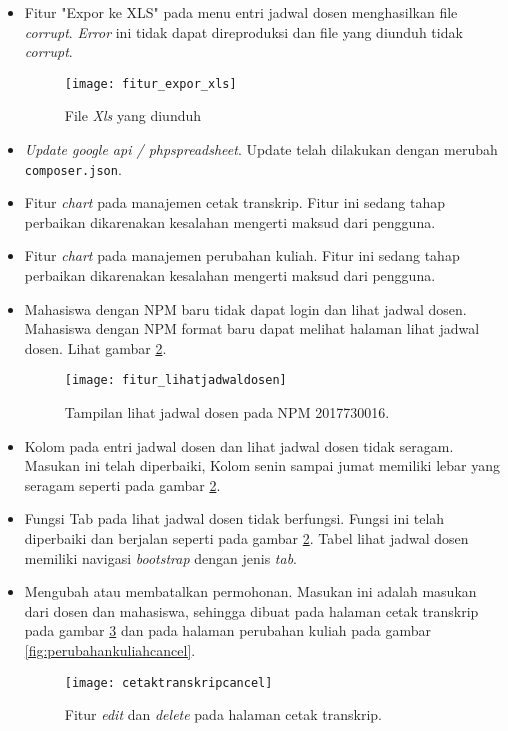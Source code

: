 \documentclass[a4paper,twoside]{article}
\begin{document}
\begin{enumerate}
	\begin{itemize}
		\item Fitur "Expor ke XLS" pada menu  entri jadwal dosen  menghasilkan file \textit{corrupt}. \textit{Error} ini tidak dapat direproduksi dan file yang diunduh tidak \textit{corrupt}.		
		\begin{figure}[H]
			\centering
			\texttt{[image: fitur\_expor\_xls]} 
			\caption{File \textit{Xls} yang diunduh}
			\label{fig:expor_ke_xls} 
		\end{figure}
		
		\item \textit{Update google api / phpspreadsheet}. Update telah dilakukan dengan merubah \texttt{composer.json}.
				
		\item  Fitur \textit{chart} pada manajemen cetak transkrip. Fitur ini sedang tahap perbaikan dikarenakan kesalahan mengerti maksud dari pengguna.		
		
		\item Fitur \textit{chart} pada manajemen perubahan kuliah. Fitur ini sedang tahap perbaikan dikarenakan kesalahan mengerti maksud dari pengguna.	
		
		\item Mahasiswa dengan NPM baru tidak dapat login dan lihat jadwal dosen. Mahasiswa dengan NPM format baru dapat melihat halaman lihat jadwal dosen. Lihat gambar \ref{fig:lihatjadwaldosen}.		
		\begin{figure}[H]
			\centering
			\texttt{[image: fitur\_lihatjadwaldosen]} 
			\caption{Tampilan lihat jadwal dosen pada NPM 2017730016.}
			\label{fig:lihatjadwaldosen} 
		\end{figure}
				
		\item Kolom pada entri jadwal dosen dan lihat jadwal dosen tidak seragam. Masukan ini telah diperbaiki, Kolom senin sampai jumat memiliki lebar yang seragam seperti pada gambar \ref{fig:lihatjadwaldosen}.		
		\item Fungsi Tab pada lihat jadwal dosen tidak berfungsi. Fungsi ini telah diperbaiki dan berjalan seperti pada gambar \ref{fig:lihatjadwaldosen}. Tabel lihat jadwal dosen memiliki navigasi \textit{bootstrap} dengan jenis \textit{tab}.
		\item Mengubah atau membatalkan permohonan. Masukan ini adalah masukan dari dosen dan mahasiswa, sehingga dibuat pada halaman cetak transkrip pada gambar \ref{fig:cetaktranskripcancel} dan pada halaman perubahan kuliah pada gambar \ref{fig:perubahankuliahcancel}.
		\begin{figure}[H]
			\centering
			\texttt{[image: cetaktranskripcancel]} 
			\caption{Fitur \textit{edit} dan \textit{delete} pada halaman cetak transkrip.}
			\label{fig:cetaktranskripcancel} 
		\end{figure}
	

\end{itemize}
\end{enumerate}
\end{document}
